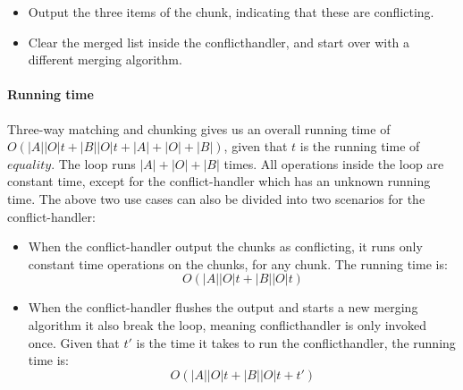 \documentclass[11pt]{article}
\begin{document}
\begin{itemize}
   \item Output the three items of the chunk, indicating that these are conflicting.
   \item Clear the merged list inside the conflicthandler, and start over with a different merging algorithm.
\end{itemize}

\paragraph{Running time} Three-way matching and chunking gives us an overall running time of $O(|A||O| t + |B||O| t + |A|+|O|+|B|)$, given that $t$ is the running time of $equality$. The loop runs $|A|+|O|+|B|$ times. All operations inside the loop are constant time, except for the conflict-handler which has an unknown running time. The above two use cases can also be divided into two scenarios for the conflict-handler:

\begin{itemize}
	\item When the conflict-handler output the chunks as conflicting, it runs only constant time operations on the chunks, for any chunk. The running time is:\\
		\begin{equation}
			O(|A||O| t + |B||O| t) \nonumber
		\end{equation}

	
	\item When the conflict-handler flushes the output and starts a new merging algorithm it also break the loop, meaning conflicthandler is only invoked once. Given that $t'$ is the time it takes to run the conflicthandler, the running time is:\\
		\begin{equation}
			O(|A||O| t + |B||O| t + t') \nonumber
		\end{equation}

\end{itemize}
\end{document}
